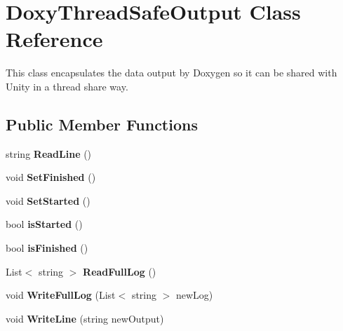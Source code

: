 \hypertarget{class_doxy_thread_safe_output}{}\section{Doxy\+Thread\+Safe\+Output Class Reference}
\label{class_doxy_thread_safe_output}


This class encapsulates the data output by Doxygen so it can be shared with Unity in a thread share way.  


\subsection*{Public Member Functions}
\begin{DoxyCompactItemize}
\item 
string {\bfseries Read\+Line} ()\hypertarget{class_doxy_thread_safe_output_a84958c6ebe8de10ced504bf5f2fde015}{}\label{class_doxy_thread_safe_output_a84958c6ebe8de10ced504bf5f2fde015}

\item 
void {\bfseries Set\+Finished} ()\hypertarget{class_doxy_thread_safe_output_a97e2149569e2bb5e749851daa2781423}{}\label{class_doxy_thread_safe_output_a97e2149569e2bb5e749851daa2781423}

\item 
void {\bfseries Set\+Started} ()\hypertarget{class_doxy_thread_safe_output_ad08186c77f145bc3cb1ddb50259ef589}{}\label{class_doxy_thread_safe_output_ad08186c77f145bc3cb1ddb50259ef589}

\item 
bool {\bfseries is\+Started} ()\hypertarget{class_doxy_thread_safe_output_afc9e32fd7203a5c6c74ee914241c3e79}{}\label{class_doxy_thread_safe_output_afc9e32fd7203a5c6c74ee914241c3e79}

\item 
bool {\bfseries is\+Finished} ()\hypertarget{class_doxy_thread_safe_output_a676622488e7bec792b66693fc1f20e73}{}\label{class_doxy_thread_safe_output_a676622488e7bec792b66693fc1f20e73}

\item 
List$<$ string $>$ {\bfseries Read\+Full\+Log} ()\hypertarget{class_doxy_thread_safe_output_a40486922d565c2b83934fd8e863bf843}{}\label{class_doxy_thread_safe_output_a40486922d565c2b83934fd8e863bf843}

\item 
void {\bfseries Write\+Full\+Log} (List$<$ string $>$ new\+Log)\hypertarget{class_doxy_thread_safe_output_aa831eccd758e59c835fd3486c39a4a8c}{}\label{class_doxy_thread_safe_output_aa831eccd758e59c835fd3486c39a4a8c}

\item 
void {\bfseries Write\+Line} (string new\+Output)\hypertarget{class_doxy_thread_safe_output_ab2083e9efa17a35c72d3c2c784ef6800}{}\label{class_doxy_thread_safe_output_ab2083e9efa17a35c72d3c2c784ef6800}

\end{DoxyCompactItemize}


